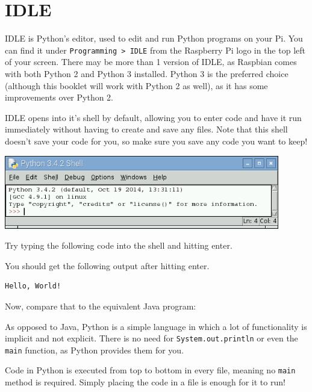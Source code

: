 \section{IDLE}

	IDLE is Python's editor, used to edit and run Python programs on your Pi. You can find it under \texttt{Programming > IDLE} from the Raspberry Pi logo in the top left of your screen. There may be more than 1 version of IDLE, as Raspbian comes with both Python 2 and Python 3 installed. Python 3 is the preferred choice (although this booklet will work with Python 2 as well), as it has some improvements over Python 2.

	IDLE opens into it's shell by default, allowing you to enter code and have it run immediately without having to create and save any files. Note that this shell doesn't save your code for you, so make sure you save any code you want to keep!

	\ifprint
	\else
		\begin{center}
			\includegraphics[width=120mm]{McrRaspJam/014_Python/1_idle/screenshot}
		\end{center}
	\fi

	Try typing the following code into the shell and hitting enter.

	

	You should get the following output after hitting enter.

	\begin{lstlisting}[style=Terminal, numbers=none]
Hello, World!
	\end{lstlisting}

	Now, compare that to the equivalent Java program:

	

	As opposed to Java, Python is a simple language in which a lot of functionality is implicit and not explicit. There is no need for \texttt{System.out.println} or even the \texttt{main} function, as Python provides them for you.

	\begin{aside}[Execution]
		Code in Python is executed from top to bottom in every file, meaning no \texttt{main} method is required. Simply placing the code in a file is enough for it to run!
	\end{aside}
